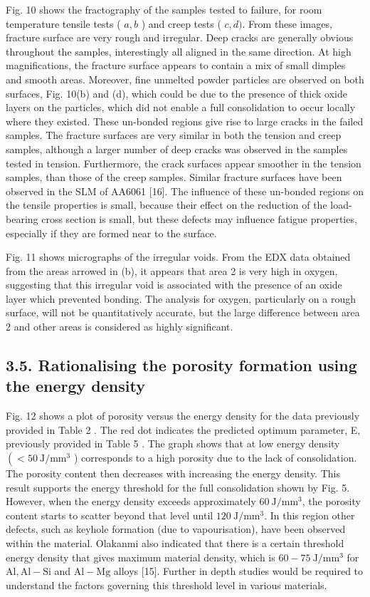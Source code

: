 \documentclass[10pt]{article}
\begin{document}
Fig. 10 shows the fractography of the samples tested to failure, for room temperature tensile tests ( $a, b$ ) and creep tests ( $c, d)$. From these images, fracture surface are very rough and irregular. Deep cracks are generally obvious throughout the samples, interestingly all aligned in the same direction. At high magnifications, the fracture surface appears to contain a mix of small dimples and smooth areas. Moreover, fine unmelted powder particles are observed on both surfaces, Fig. 10(b) and (d), which could be due to the presence of thick oxide layers on the particles, which did not enable a full consolidation to occur locally where they existed. These un-bonded regions give rise to large cracks in the failed samples. The fracture surfaces are very similar in both the tension and creep samples, although a larger number of deep cracks was observed in the samples tested in tension. Furthermore, the crack surfaces appear smoother in the tension samples, than those of the creep samples. Similar fracture surfaces have been observed in the SLM of AA6061 [16]. The influence of these un-bonded regions on the tensile properties is small, because their effect on the reduction of the load-bearing cross section is small, but these defects may influence fatigue properties, especially if they are formed near to the surface.

Fig. 11 shows micrographs of the irregular voids. From the EDX data obtained from the areas arrowed in (b), it appears that area 2 is very high in oxygen, suggesting that this irregular void is associated with the presence of an oxide layer which prevented bonding. The analysis for oxygen, particularly on a rough surface, will not be quantitatively accurate, but the large difference between area 2 and other areas is considered as highly significant.

\subsection*{3.5. Rationalising the porosity formation using the energy density}
Fig. 12 shows a plot of porosity versus the energy density for the data previously provided in Table 2 . The red dot indicates the predicted optimum parameter, E, previously provided in Table 5 . The graph shows that at low energy density $\left(<50 \mathrm{~J} / \mathrm{mm}^{3}\right.$ ) corresponds to a high porosity due to the lack of consolidation. The porosity content then decreases with increasing the energy density. This result supports the energy threshold for the full consolidation shown by Fig. 5. However, when the energy density exceeds approximately $60 \mathrm{~J} / \mathrm{mm}^{3}$, the porosity content starts to scatter beyond that level until $120 \mathrm{~J} / \mathrm{mm}^{3}$. In this region other defects, such as keyhole formation (due to vapourisation), have been observed within the material. Olakanmi also indicated that there is a certain threshold energy density that gives maximum material density, which is $60-75 \mathrm{~J} / \mathrm{mm}^{3}$ for $\mathrm{Al}, \mathrm{Al}-\mathrm{Si}$ and $\mathrm{Al}-\mathrm{Mg}$ alloys [15]. Further in depth studies would be required to understand the factors governing this threshold level in various materials.
\end{document}
